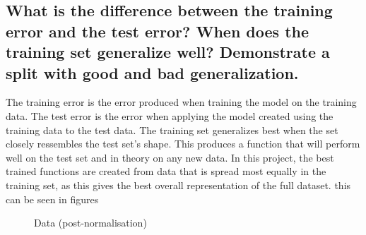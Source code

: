\documentclass[titlepage]{scrartcl}
\begin{document}
\subsection{What is the difference between the training error and the test
    error? When does the training set generalize well? Demonstrate a split with
good and bad generalization.}
The training error is the error produced when training the model on the
training data. The test error is the error when applying the model created
using the training data to the test data.
The training set generalizes best when the set closely ressembles the test
set's shape. This produces a function that will perform well on the test set
and in theory on any new data. In this project, the best trained functions are
created from data that is spread most equally in the training set, as this
gives the best overall representation of the full dataset. this can be seen in
figures 

\begin{figure}
    \caption{}
    \label{LRRawData}
    \caption{Data (post-normalisation)}
    \label{LRNormalisedData}
\end{figure}

\end{document}
